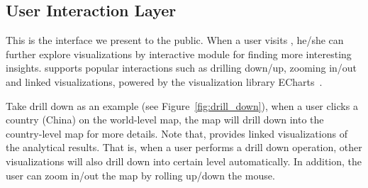 \subsection{User Interaction Layer}
\label{subsec:ie}
This is the interface we present to the public.
When a user visits \sys, he/she can further explore visualizations by interactive module for finding more interesting insights. \sys supports popular interactions such as drilling down/up, zooming in/out and linked visualizations, powered by the visualization library ECharts~\cite{DBLP:journals/vi/LiMSSZWZC18}.

Take drill down as an example (see Figure~\ref{fig:drill_down}), when a user clicks a country (\eg China) on the world-level map, the map will drill down into the country-level map for more details.
Note that, \sys provides linked visualizations of the analytical results. That is, when a user performs a drill down operation, other visualizations will also drill down into certain level automatically. In addition, the user can zoom in/out the map by rolling up/down the mouse. 








